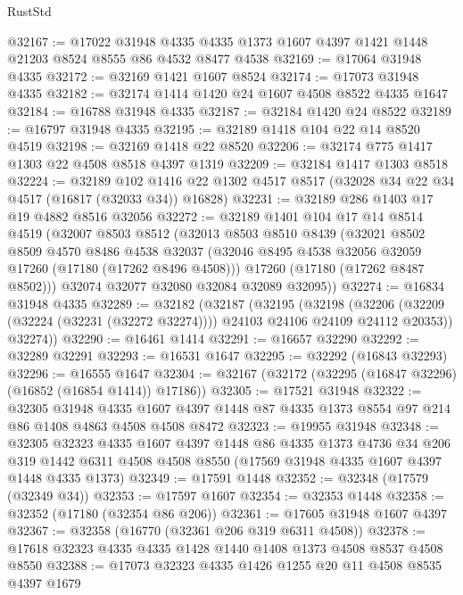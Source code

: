 \begin{lexlean}{RustStd}
\begin{coremodule}
{\begin{coremodule}
{{{{{{{{{{{{{{{{{{{{{{{{{{{{{{{{{{{{{{{{{{{{{{{{{{{{{{{@32167 := @17022
    @31948
    @4335
    @4335
    @1373
    @1607
    @4397
    @1421
    @1448
    @21203
    @8524
    @8555
    @86
    @4532
    @8477
    @4538
@32169 := @17064 @31948 @4335
@32172 := @32169 @1421 @1607 @8524
@32174 := @17073 @31948 @4335
@32182 := @32174 @1414 @1420 @24 @1607 @4508 @8522 @4335 @1647
@32184 := @16788 @31948 @4335
@32187 := @32184 @1420 @24 @8522
@32189 := @16797 @31948 @4335
@32195 := @32189 @1418 @104 @22 @14 @8520 @4519
@32198 := @32169 @1418 @22 @8520
@32206 := @32174 @775 @1417 @1303 @22 @4508 @8518 @4397 @1319
@32209 := @32184 @1417 @1303 @8518
@32224 := @32189
    @102
    @1416
    @22
    @1302
    @4517
    @8517
    (@32028 @34 @22 @34 @4517 (@16817 (@32033 @34)) @16828)
@32231 := @32189 @286 @1403 @17 @19 @4882 @8516 @32056
@32272 := @32189
    @1401
    @104
    @17
    @14
    @8514
    @4519
    (@32007
      @8503
      @8512
      (@32013
        @8503
        @8510
        @8439
        (@32021
          @8502
          @8509
          @4570
          @8486
          @4538
          @32037
          (@32046 @8495 @4538 @32056 @32059 @17260 (@17180 (@17262 @8496 @4508)))
          @17260
          (@17180 (@17262 @8487 @8502)))
        @32074
        @32077
        @32080
        @32084
        @32089
        @32095))
@32274 := @16834 @31948 @4335
@32289 := @32182
    (@32187
      (@32195
        (@32198
          (@32206 (@32209 (@32224 (@32231 (@32272 @32274)))) @24103 @24106 @24109 @24112 @20353))
        @32274))
@32290 := @16461 @1414
@32291 := @16657 @32290
@32292 := @32289 @32291
@32293 := @16531 @1647
@32295 := @32292 (@16843 @32293)
@32296 := @16555 @1647
@32304 := @32167 (@32172 (@32295 (@16847 @32296) (@16852 (@16854 @1414)) @17186))
@32305 := @17521 @31948
@32322 := @32305
    @31948
    @4335
    @1607
    @4397
    @1448
    @87
    @4335
    @1373
    @8554
    @97
    @214
    @86
    @1408
    @4863
    @4508
    @4508
    @8472
@32323 := @19955 @31948
@32348 := @32305
    @32323
    @4335
    @1607
    @4397
    @1448
    @86
    @4335
    @1373
    @4736
    @34
    @206
    @319
    @1442
    @6311
    @4508
    @4508
    @8550
    (@17569 @31948 @4335 @1607 @4397 @1448 @4335 @1373)
@32349 := @17591 @1448
@32352 := @32348 (@17579 (@32349 @34))
@32353 := @17597 @1607
@32354 := @32353 @1448
@32358 := @32352 (@17180 (@32354 @86 @206))
@32361 := @17605 @31948 @1607 @4397
@32367 := @32358 (@16770 (@32361 @206 @319 @6311 @4508))
@32378 := @17618 @32323 @4335 @4335 @1428 @1440 @1408 @1373 @4508 @8537 @4508 @8550
@32388 := @17073 @32323 @4335 @1426 @1255 @20 @11 @4508 @8535 @4397 @1679
}}}}}}}}}}}}}}}}}}}}}}}}}}}}}}}}}}}}}}}}}}}}}}}}}}}}}}}
\end{coremodule}}
\end{coremodule}
\end{lexlean}
